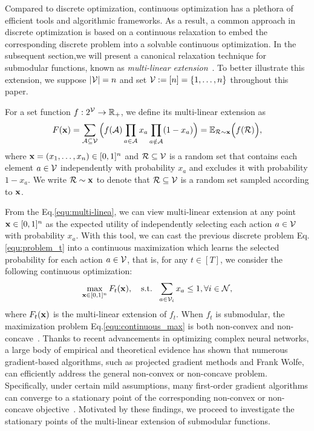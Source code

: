 Compared to discrete optimization, continuous optimization has a plethora of efficient tools and algorithmic frameworks. As a result, a common approach in discrete optimization is based on a continuous relaxation to embed the corresponding discrete problem into a solvable continuous optimization. In the subsequent section,we will present a canonical relaxation technique for submodular functions, known as \emph{multi-linear extension}~\citep{calinescu2011maximizing,chekuri2014submodular}. To better illustrate this extension, we suppose $|\mathcal{V}|=n$ and set $\mathcal{V}:=[n]=\{1,\dots,n\}$  throughout this paper. 
\begin{definition}\label{def1:multi-linear}
For a set function $f:2^{\mathcal{V}}\rightarrow\mathbb{R}_{+}$, we define its multi-linear extension  as 
	\begin{equation}
	\label{equ:multi-linea}
	F(\mathbf{x})=\sum_{\mathcal{A}\subseteq\mathcal{V}}\Big(f(\mathcal{A})\prod_{a\in\mathcal{A}}x_{a}\prod_{a\notin\mathcal{A}}(1-x_{a})\Big)=\mathbb{E}_{\mathcal{R}\sim\mathbf{x}}\Big(f(\mathcal{R})\Big),
\end{equation} where $\mathbf{x}=(x_{1},\dots,x_{n})\in [0,1]^{n}$ and $\mathcal{R}\subseteq\mathcal{V}$ is a random set that contains each element $a\in\mathcal{V}$ independently with probability $x_{a}$ and excludes it with probability $1-x_{a}$. We write $\mathcal{R}\sim\mathbf{x}$ to denote that $\mathcal{R}\subseteq\mathcal{V}$ is a random set sampled according to $\mathbf{x}$. 
\end{definition}
From the Eq.\eqref{equ:multi-linea}, we can view multi-linear extension at any point $\mathbf{x}\in[0,1]^{n}$ as the expected utility of independently selecting each action $a\in\mathcal{V}$ with probability $x_{a}$.  With this tool, we can cast the previous discrete problem Eq.\eqref{equ:problem_t} into a continuous maximization which learns the selected probability for each action $a\in\mathcal{V}$, that is, for any $t\in[T]$, we consider the following continuous optimization:\vspace{-0.2em}
	\begin{equation}\label{equ:continuous_max}
		\max_{\x\in[0,1]^{n}} F_{t}(\x),\ \ \text{ s.t.}\ \  \sum_{a\in\V_{i}}x_{a}\le1,\forall i\in\N,\vspace{-0.3em} 
	\end{equation}where $F_{t}(\mathbf{x})$ is the multi-linear extension of $f_{t}$.
When $f_{t}$ is submodular, the maximization problem Eq.\eqref{equ:continuous_max} is both non-convex and non-concave~\citep{bian2020continuous}. Thanks to recent advancements in optimizing complex neural networks, a large body of empirical and theoretical evidence has shown that numerous gradient-based algorithms, such as projected gradient methods and Frank Wolfe, can efficiently address the general non-convex or non-concave problem. Specifically, under certain mild assumptions, many first-order gradient algorithms can converge to a stationary point of the corresponding non-convex or non-concave objective~\citep{nesterov2013introductory,lacoste2016convergence,jin2017escape,agarwal2017finding,hassani2017gradient}. Motivated by these findings, we proceed to investigate the stationary points of the multi-linear extension of submodular functions.
